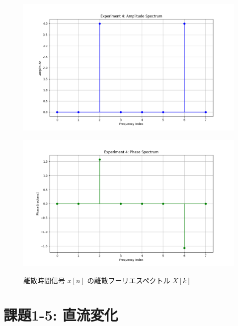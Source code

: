 \documentclass[fleqn, a4paper. 12pt]{jsarticle}
\begin{document}
  \begin{figure}[h]
    \begin{center}
    \begin{minipage}[t]{0.48\columnwidth}
        \includegraphics[width=\columnwidth]{amplitude_spectrum_experiment_4.png}
        \label{fign:a4}
    \end{minipage}
    \begin{minipage}[t]{0.48\columnwidth}
        \includegraphics[width=\columnwidth]{phase_spectrum_experiment_4.png}
        \label{fign:p4}
    \end{minipage}
    \end{center}
    \caption{離散時間信号 $x[n]$ の離散フーリエスペクトル $X[k]$}
  \end{figure}

  \newpage

  \section*{課題1-5: 直流変化}
\end{document}
